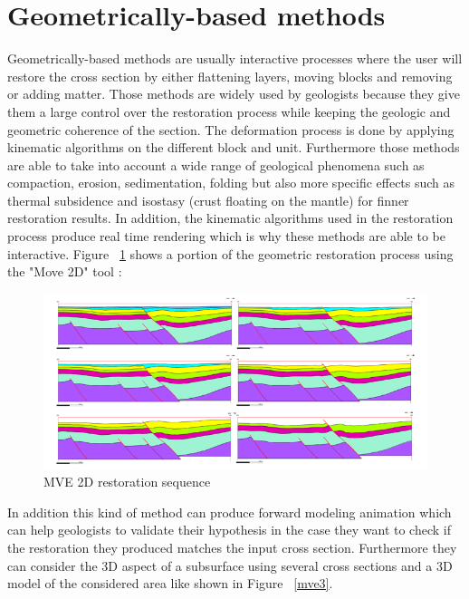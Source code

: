\documentclass[12pt, a4paper]{report} %
\begin{document}
\section{Geometrically-based methods}

Geometrically-based methods are usually interactive processes where the user will restore the cross section by either flattening layers, moving blocks and removing or adding matter.
Those methods are widely used by geologists because they give them a large control over the restoration process while keeping the geologic and geometric coherence of the section.  The deformation process is done by applying  kinematic algorithms on the different block and unit. Furthermore those methods are able to take into account a wide range of geological phenomena such as compaction, erosion, sedimentation, folding but also more specific effects such as thermal subsidence and isostasy (crust floating on the mantle) \cite{Isostasy} for finner restoration results. In addition, the kinematic algorithms used in the restoration process produce real time rendering which is why these methods are able to be interactive.
Figure ~\ref{mve} shows a portion of the geometric restoration process using the "Move 2D" tool \cite{Move}:

\begin{figure}[H]
	\centering
	\includegraphics[scale=3]{mve2D.png}
	\caption{MVE 2D restoration sequence}
	\label{mve}
\end{figure}

In addition this kind of method can produce forward modeling animation which can help geologists to validate their hypothesis in the case they want to check if the restoration they produced matches the input cross section. Furthermore they can consider the 3D aspect of a subsurface using several cross sections and a 3D model of the considered area like shown in Figure ~\ref{mve3}.
\end{document}
